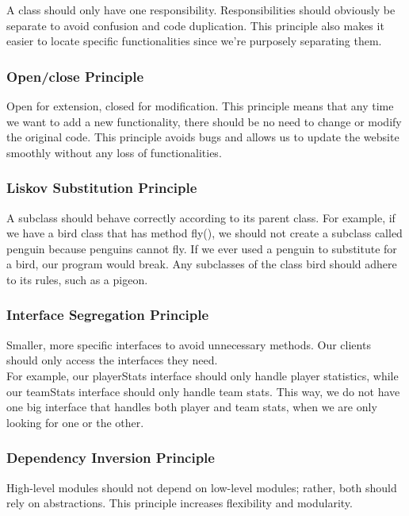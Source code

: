 \documentclass{article}
\begin{document}
A class should only have one responsibility. Responsibilities should obviously be separate to avoid confusion and code duplication. This principle also makes it easier to locate specific functionalities since we're purposely separating them.

\subsubsection*{Open/close Principle}

Open for extension, closed for modification. This principle means that any time we want to add a new functionality, there should be no need to change or modify the original code. This principle avoids bugs and allows us to update the website smoothly without any loss of functionalities.

\subsubsection*{Liskov Substitution Principle}

A subclass should behave correctly according to its parent class. For example, if we have a bird class that has method fly(), we should not create a subclass called penguin because penguins cannot fly. If we ever used a penguin to substitute for a bird, our program would break. Any subclasses of the class bird should adhere to its rules, such as a pigeon.

\subsubsection*{Interface Segregation Principle}

Smaller, more specific interfaces to avoid unnecessary methods. Our clients should only access the interfaces they need. \\

\noindent For example, our playerStats interface should only handle player statistics, while our teamStats interface should only handle team stats. This way, we do not have one big interface that handles both player and team stats, when we are only looking for one or the other.


\subsubsection*{Dependency Inversion Principle}

High-level modules should not depend on low-level modules; rather, both should rely on abstractions. This principle increases flexibility and modularity. \\
\end{document}
